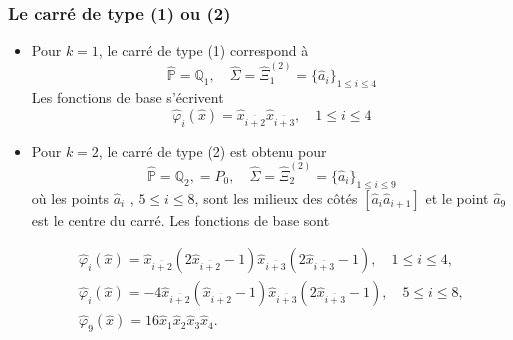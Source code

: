 \documentclass{beamer}
\begin{document}
\begin{frame}
\frametitle{Le carré de type (1) ou (2)}
  \begin{itemize}
\item  Pour $k = 1$, le carré de type (1) correspond à
\[\widehat{\mathbb{P}} = \mathbb{Q}_1,\quad \widehat{\Sigma} =\widehat{\Xi}_1^{(2)}=\{\hat{a}_i\}_{1\leq i\leq 4}\]
Les fonctions de base s'écrivent
\[\widehat{\varphi}_i(\hat{x})=\hat{x}_{\overline{i+2}}\hat{x}_{\overline{i+3}},\quad 1\leq i\leq 4\]

\item  Pour $k=2$, le carré de type (2) est obtenu pour
\[\widehat{\mathbb{P}} = \mathbb{Q}_2, = P_0 ,\quad \widehat{\Sigma} =\widehat{\Xi}_2^{(2)}=\{\hat{a}_i\}_{1\leq i\leq 9}\]
où les points $\hat{a}_i$ , $5\leq i \leq 8$, sont les milieux des côtés $[\hat{a}_i \hat{a}_{i+1}]$ et le point $\hat{a}_9$ est le centre du carré. Les fonctions de base sont

\begin{equation}
  \begin{array}{l}
  \widehat{\varphi}_i(\hat{x})=\hat{x}_{\overline{i+2}}(2\hat{x}_{\overline{i+2}}-1)\hat{x}_{\overline{i+3}}(2\hat{x}_{\overline{i+3}}-1),\quad 1\leq i\leq 4,\\
  \widehat{\varphi}_i(\hat{x})=-4\hat{x}_{\overline{i+2}}(\hat{x}_{\overline{i+2}}-1)\hat{x}_{\overline{i+3}}(2\hat{x}_{\overline{i+3}}-1),\quad 5\leq i\leq 8,\\
  \widehat{\varphi}_9(\hat{x})=16 \hat{x}_1\hat{x}_2\hat{x}_3\hat{x}_4.
\end{array}              
\end{equation}
\end{itemize}
\end{frame}
\end{document}

